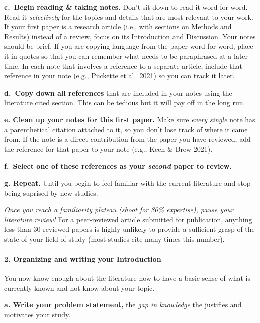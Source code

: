 \documentclass[
]{book}
\begin{document}
\textbf{c.~Begin reading \& taking notes.} Don't sit down to read it word for word. Read it \emph{selectively} for the topics and details that are most relevant to your work. If your first paper is a research article (i.e., with sections on Methods and Results) instead of a review, focus on its Introduction and Discussion. Your notes should be brief. If you are copying language from the paper word for word, place it in quotes so that you can remember what needs to be paraphrased at a later time. In each note that involves a reference to a separate article, include that reference in your note (e.g.,
Puckette et al.~2021) so you can track it later.

\textbf{d.~Copy down all references} that are included in your notes using the literature cited section. This can be tedious but it will pay off in the long run.

\textbf{e. Clean up your notes for this first paper.} Make sure \emph{every single} note has a parenthetical citation attached to it, so you don't lose track of where it came from. If the note is a direct contribution from the paper you have reviewed, add the reference for that paper to your note (e.g., Keen \& Brew 2021).

\textbf{f.~Select one of these references as your \emph{second} paper to review.}

\textbf{g. Repeat.} Until you begin to feel familiar with the current literature and stop being suprised by new studies.

\emph{Once you reach a familiarity plateau (shoot for 80\% expertise), pause your literature review!} For a peer-reviewed article submitted for publication, anything less than 30 reviewed papers is highly unlikely to provide a sufficient grasp of the state of your field of study (most studies cite many times this number).

\hypertarget{organizing-and-writing-your-introduction}{%
\paragraph*{2. Organizing and writing your Introduction}\label{organizing-and-writing-your-introduction}}

You now know enough about the literature now to have a basic sense of what is currently known and not know about your topic.

\textbf{a. Write your problem statement,} the \emph{gap in knowledge} the justifies and motivates your study.
\end{document}
